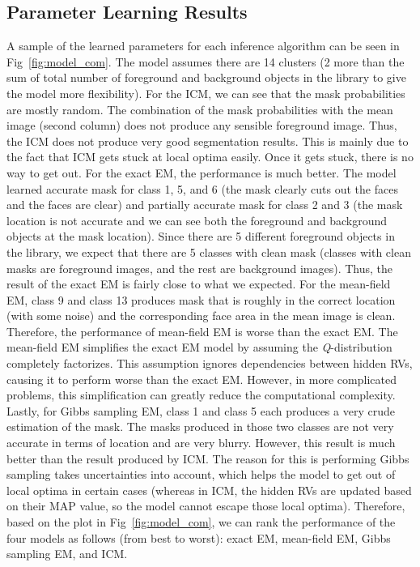 \documentclass{article} %
\begin{document}
\subsection{Parameter Learning Results}
\label{parameter_result}
A sample of the learned parameters for each inference algorithm can be seen in Fig~\ref{fig:model_com}. The model assumes there are 14 clusters (2 more than the sum of total number of foreground and background objects in the library to give the model more flexibility). For the ICM, we can see that the mask probabilities are mostly random. The combination of the mask probabilities with the mean image (second column) does not produce any sensible foreground image. Thus, the ICM does not produce very good segmentation results. This is mainly due to the fact that ICM gets stuck at local optima easily. Once it gets stuck, there is no way to get out. For the exact EM, the performance is much better. The model learned accurate mask for class 1, 5, and 6 (the mask clearly cuts out the faces and the faces are clear) and partially accurate mask for class 2 and 3 (the mask location is not accurate and we can see both the foreground and background objects at the mask location). Since there are 5 different foreground objects in the library, we expect that there are 5 classes with clean mask (classes with clean masks are foreground images, and the rest are background images). Thus, the result of the exact EM is fairly close to what we expected. For the mean-field EM, class 9 and class 13 produces mask that is roughly in the correct location (with some noise) and the corresponding face area in the mean image is clean. Therefore, the performance of mean-field EM is worse than the exact EM. The mean-field EM simplifies the exact EM model by assuming the \textit{Q}-distribution completely factorizes. This assumption ignores dependencies between hidden RVs, causing it to perform worse than the exact EM. However, in more complicated problems, this simplification can greatly reduce the computational complexity. Lastly, for Gibbs sampling EM, class 1 and class 5 each produces a very crude estimation of the mask. The masks produced in those two classes are not very accurate in terms of location and are very blurry. However, this result is much better than the result produced by ICM. The reason for this is performing Gibbs sampling takes uncertainties into account, which helps the model to get out of local optima in certain cases (whereas in ICM, the hidden RVs are updated based on their MAP value, so the model cannot escape those local optima). Therefore, based on the plot in Fig~\ref{fig:model_com}, we can rank the performance of the four models as follows (from best to worst): exact EM, mean-field EM, Gibbs sampling EM, and ICM.
\end{document}
